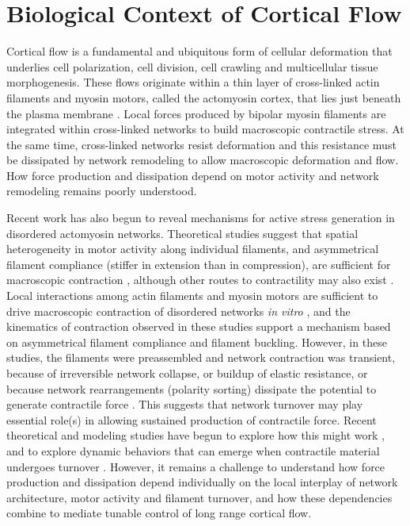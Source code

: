 

\section{Biological Context of Cortical Flow}
Cortical flow is a fundamental and ubiquitous form of cellular deformation that underlies cell polarization, cell division, cell crawling and multicellular tissue morphogenesis\cite{cellmech_flows3,cellmech_flows2,Benink:2000aa,Wilson:2010aa,Rauzi2010,Munro2004413}. These flows originate within a thin layer of cross-linked actin filaments and myosin motors, called the actomyosin cortex, that lies just beneath the plasma membrane \cite{Salbreux2012536}. Local forces produced by bipolar myosin filaments are integrated within cross-linked networks to build macroscopic contractile stress\cite{Murrell:2015aa,Bendix20083126,Janson1005}.  At the same time, cross-linked networks resist deformation and this resistance must be dissipated by network remodeling to allow macroscopic deformation and flow.  How force production and dissipation depend on motor activity and network remodeling remains poorly understood.

Recent work has also begun to reveal mechanisms for active stress generation in disordered actomyosin networks. Theoretical studies suggest that spatial heterogeneity in motor activity along individual filaments, and asymmetrical filament compliance (stiffer in extension than in compression), are sufficient for macroscopic contraction \cite{1367-2630-14-3-033037,PhysRevX.4.041002}, although other routes to contractility may also exist \cite{PhysRevX.4.041002}.  Local interactions among actin filaments and myosin motors are sufficient to drive macroscopic contraction of disordered networks {\em in vitro} \cite{rheo_2D1}, and the kinematics of contraction observed in these studies support a mechanism based on asymmetrical filament compliance and filament buckling.  However, in these studies, the filaments were preassembled and network contraction was transient, because of irreversible network collapse\cite{Alvarado:2013aa}, or buildup of elastic resistance\cite{Murrell15062014}, or because network rearrangements (polarity sorting) dissipate the potential to generate contractile force \cite{Ennomani2016616,Reymann1310,Ndlec:1997aa,Surrey1167}. This suggests that network turnover may play essential role(s) in allowing sustained production of contractile force. Recent theoretical and modeling studies have begun to explore how this might work \cite{2015arXiv150706182H,Mak:2016aa,10.1371/journal.pone.0000696}, and to explore dynamic behaviors that can emerge when contractile material undergoes turnover \cite{PhysRevLett.103.058102,PhysRevLett.113.148102}. However, it remains a challenge to understand how force production and dissipation depend individually on the local interplay of network architecture, motor activity and filament turnover, and how these dependencies combine to mediate tunable control of long range cortical flow. 

